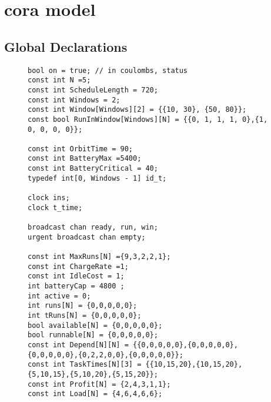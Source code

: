 \chapter{\gls{cora} model}\label{appendix:cora_models}

\section{Global Declarations}
\begin{figure}[H]
\begin{lstlisting}[language=my_c, caption={Global declarations}, label=lst:core_global_declarations_code0]
bool on = true; // in coulombs, status
const int N =5;
const int ScheduleLength = 720;
const int Windows = 2;
const int Window[Windows][2] = {{10, 30}, {50, 80}};
const bool RunInWindow[Windows][N] = {{0, 1, 1, 1, 0},{1, 0, 0, 0, 0}};

const int OrbitTime = 90;
const int BatteryMax =5400;
const int BatteryCritical = 40;
typedef int[0, Windows - 1] id_t;

clock ins;
clock t_time;

broadcast chan ready, run, win;
urgent broadcast chan empty;

const int MaxRuns[N] ={9,3,2,2,1};
const int ChargeRate =1;
const int IdleCost = 1;
int batteryCap = 4800 ;
int active = 0;
int runs[N] = {0,0,0,0,0};
int tRuns[N] = {0,0,0,0,0};
bool available[N] = {0,0,0,0,0};
bool runnable[N] = {0,0,0,0,0};
const int Depend[N][N] = {{0,0,0,0,0},{0,0,0,0,0},{0,0,0,0,0},{0,2,2,0,0},{0,0,0,0,0}};
const int TaskTimes[N][3] = {{10,15,20},{10,15,20},{5,10,15},{5,10,20},{5,15,20}};
const int Profit[N] = {2,4,3,1,1};
const int Load[N] = {4,6,4,6,6};
\end{lstlisting}
\end{figure}

